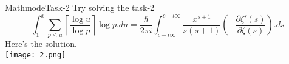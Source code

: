 \begin{frame}{Mathmode}{Task-2}
    Try solving the task-2
$$ \int_{1}^{x} \sum_{p\leq u}\left\lceil \frac{\log u}{\log p} \right\rceil \log p.du
= \frac{\hbar}{2\pi i}\int_{c-\iota \infty}^{c+\iota \infty}
\frac{x^{s+1}}{s(s+1)} \left( - \frac{\partial\zeta '(s)}{\partial\zeta(s)} \right).ds$$
\pause
Here's the solution.\\ \pause
\center
\texttt{[image: 2.png]}

\end{frame}
